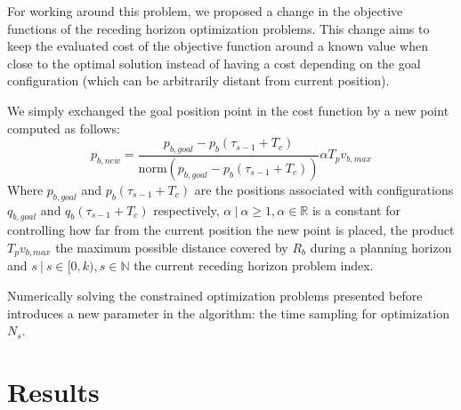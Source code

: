 For working around this problem, we proposed a change in the objective functions
of the receding horizon optimization problems. This change aims to keep the 
evaluated cost of the objective function around a known value when close to the optimal
solution instead of having a cost depending on the goal configuration (which can be arbitrarily distant from current position).

We simply exchanged the goal position point in the cost function by a new point computed as follows:
$$
    p_{b,new} = \frac{p_{b,goal} - p_{b}(\tau_{s-1}+T_c) }{\mathrm{norm}(p_{b,goal} - p_{b}(\tau_{s-1}+T_c) )} \alpha T_pv_{b,max}
$$
Where $p_{b,goal}$ and $p_{b}(\tau_{s-1}+T_c)$ are the positions associated with configurations $q_{b,goal}$ and $q_{b}(\tau_{s-1}+T_c)$ respectively, $\alpha\ |\ 
\alpha \geq 1, \alpha \in \mathbb{R}$ is a constant for controlling how far from the
current position the new point is placed, the product $T_pv_{b,max}$ the maximum possible distance covered by $R_b$ during a planning horizon and $s\ |\ s \in [0, k), s \in \mathbb{N}$ the current receding horizon problem index.

Numerically solving the constrained optimization problems presented before introduces
a new parameter in the algorithm: the time sampling for optimization $N_s$.









\chapter{Results}
\let\cleardoublepage\savecleardoublepage

